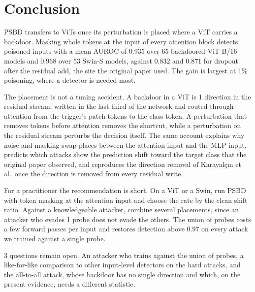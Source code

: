 \section{Conclusion}
\label{sec:conclusion}

PSBD transfers to ViTs once its perturbation is placed where a ViT carries a backdoor. Masking whole tokens at the input of every attention block detects poisoned inputs with a mean AUROC of 0.935 over 65 backdoored ViT-B/16 models and 0.968 over 53 Swin-S models, against 0.832 and 0.871 for dropout after the residual add, the site the original paper used. The gain is largest at 1\% poisoning, where a detector is needed most.

The placement is not a tuning accident. A backdoor in a ViT is 1 direction in the residual stream, written in the last third of the network and routed through attention from the trigger's patch tokens to the class token. A perturbation that removes tokens before attention removes the shortcut, while a perturbation on the residual stream perturbs the decision itself. The same account explains why noise and masking swap places between the attention input and the MLP input, predicts which attacks show the prediction shift toward the target class that the original paper observed, and reproduces the direction removal of Karayal\c{c}{\i}n et al.\ once the direction is removed from every residual write.

For a practitioner the recommendation is short. On a ViT or a Swin, run PSBD with token masking at the attention input and choose the rate by the clean shift ratio. Against a knowledgeable attacker, combine several placements, since an attacker who evades 1 probe does not evade the others. The union of probes costs a few forward passes per input and restores detection above 0.97 on every attack we trained against a single probe.

3 questions remain open. An attacker who trains against the union of probes, a like-for-like comparison to other input-level detectors on the hard attacks, and the all-to-all attack, whose backdoor has no single direction and which, on the present evidence, needs a different statistic.
